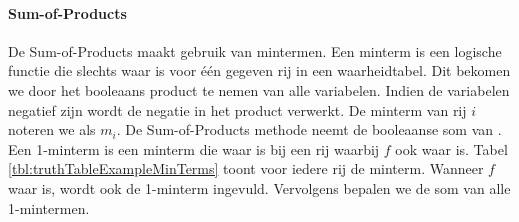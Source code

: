 \paragraph{Sum-of-Products} De Sum-of-Products maakt gebruik van mintermen. Een minterm is een logische functie die slechts waar is voor \'e\'en gegeven rij in een waarheidtabel. Dit bekomen we door het booleaans product te nemen van alle variabelen. Indien de variabelen negatief zijn wordt de negatie in het product verwerkt. De minterm van rij $i$ noteren we als $m_i$. De Sum-of-Products methode neemt de booleaanse som van . Een 1-minterm is een minterm die waar is bij een rij waarbij $f$ ook waar is. Tabel \ref{tbl:truthTableExampleMinTerms} toont voor iedere rij de minterm. Wanneer $f$ waar is, wordt ook de 1-minterm ingevuld. Vervolgens bepalen we de som van alle 1-mintermen.
